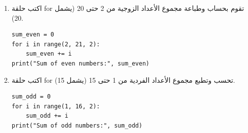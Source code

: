 \documentclass[14pt]{extarticle}
\begin{document}
\begin{enumerate}[itemsep=3em]
\item
اكتب حلقة \textenglish{for} تقوم بحساب وطباعة مجموع الأعداد الزوجية من 2 حتى 20 (يشمل 20).

\ifwithsols
\begin{boxSolution}
\begin{english}
\begin{verbatim}
sum_even = 0
for i in range(2, 21, 2):
    sum_even += i
print("Sum of even numbers:", sum_even)
\end{verbatim}
\end{english}
\end{boxSolution}
\fi

\item
اكتب حلقة \textenglish{for} تحسب وتطبع مجموع الأعداد الفردية من 1 حتى 15 (يشمل 15).

\ifwithsols
\begin{boxSolution}
\begin{english}
\begin{verbatim}
sum_odd = 0
for i in range(1, 16, 2):
    sum_odd += i
print("Sum of odd numbers:", sum_odd)
\end{verbatim}
\end{english}
\end{boxSolution}
\fi

\end{enumerate}
\clearpage
\end{document}
